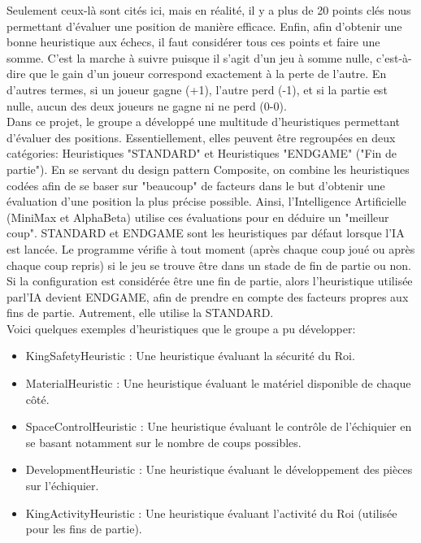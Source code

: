 \documentclass{article}
\begin{document}
Seulement ceux-là sont cités ici, mais en réalité, il y a plus de 20 points clés nous permettant d'évaluer une position de manière efficace.
Enfin, afin d'obtenir une bonne heuristique aux échecs, il faut considérer tous ces points et faire une somme. C'est la marche à suivre puisque
il s'agit d'un jeu à somme nulle, c'est-à-dire que le gain d'un joueur correspond exactement à la perte de l'autre. En d'autres termes, si un joueur gagne (+1), l'autre perd (-1), et si la partie est nulle, aucun des deux joueurs ne gagne ni ne perd (0-0). \\
Dans ce projet, le groupe a développé une multitude d'heuristiques permettant d'évaluer des positions. Essentiellement, elles peuvent être regroupées
en deux catégories: Heuristiques "STANDARD" et Heuristiques "ENDGAME" ("Fin de partie"). En se servant du design pattern Composite, on combine les
heuristiques codées afin de se baser sur "beaucoup" de facteurs dans le but d'obtenir une évaluation d'une position la plus précise possible. Ainsi,
l'Intelligence Artificielle (MiniMax et AlphaBeta) utilise ces évaluations pour en déduire un "meilleur coup". STANDARD et ENDGAME sont les 
heuristiques par défaut lorsque l'IA est lancée. Le programme vérifie à tout moment (après chaque coup joué ou après chaque coup repris)
si le jeu se trouve être dans un stade de fin de partie ou non. Si la configuration est considérée être une fin de partie, alors l'heuristique utilisée
parl'IA devient ENDGAME, afin de prendre en compte des facteurs propres aux fins de partie. Autrement, elle utilise la STANDARD.\\
Voici quelques exemples d'heuristiques que le groupe a pu développer:
\begin{itemize}
    \item KingSafetyHeuristic : Une heuristique évaluant la sécurité du Roi.
    \item MaterialHeuristic : Une heuristique évaluant le matériel disponible de chaque côté.
    \item SpaceControlHeuristic : Une heuristique évaluant le contrôle de l'échiquier en se basant notamment sur le nombre
    de coups possibles.
    \item DevelopmentHeuristic : Une heuristique évaluant le développement des pièces sur l'échiquier.
    \item KingActivityHeuristic : Une heuristique évaluant l'activité du Roi (utilisée pour les fins de partie).
\end{itemize}
\end{document}
